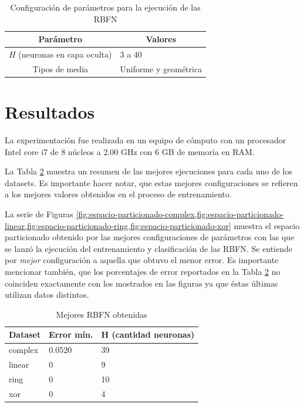 \documentclass[journal]{IEEEtran}
\begin{document}
\begin{table}[h]
\centering
\begin{tabular}{@{}cl@{}}
\toprule
\textbf{Parámetro} & \multicolumn{1}{c}{\textbf{Valores}} \\ \midrule
$H$ (neuronas en capa oculta)                  & 3 a 40                         \\
Tipos de media                & Uniforme y geométrica\\
\bottomrule
\end{tabular}
\caption{Configuración de parámetros para la ejecución de las RBFN}
\label{tbl:parametros}
\end{table}


\section{Resultados} 
\label{sec:resultados}
La experimentación fue realizada en un equipo de cómputo con un procesador Intel core i7 de 8 núcleos a 2.00 GHz con 6 GB de memoria en RAM.

La Tabla \ref{tab:best-rna} muestra un resumen de las mejores ejecuciones para cada uno de los datasets.
Es importante hacer notar, que estas mejores configuraciones se refieren a los mejores valores obtenidos en el proceso de entrenamiento.

La serie de Figuras \cref{fig:espacio-particionado-complex,fig:espacio-particionado-linear,fig:espacio-particionado-ring,fig:espacio-particionado-xor} muestra el espacio particionado obtenido por las mejores configuraciones de parámetros con las que se lanzó la ejecución del entrenamiento y clasificación de las RBFN.
Se entiende por \emph{mejor} configuración a aquella que obtuvo el menor error.
Es importante mencionar también, que los porcentajes de error reportados en la Tabla \ref{tab:best-rna} no coinciden exactamente con los mostrados en las figuras ya que éstas últimas utilizan datos distintos.

\begin{table}[h]
\centering
\begin{tabular}{@{}lll@{}}
\toprule
\multicolumn{1}{c}{\textbf{Dataset}} & \multicolumn{1}{c}{\textbf{Error mín.}} & \multicolumn{1}{c}{\textbf{H (cantidad neuronas)}} \\ \midrule
complex                              & 0.0520                                  & 39                                                 \\
linear                               & 0                                       & 9                                                  \\
ring                                 & 0                                       & 10                                                 \\
xor                                  & 0                                       & 4                                                  \\ \bottomrule
\end{tabular}
\caption{Mejores RBFN obtenidas}
\label{tab:best-rna}
\end{table}
\end{document}
